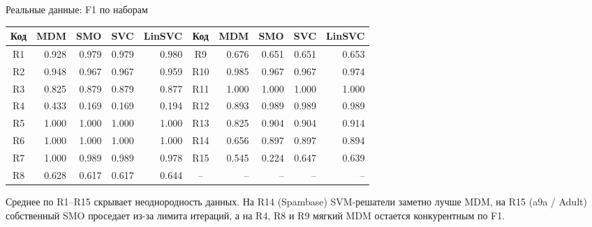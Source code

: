 \SPBGContentSlide
  {Реальные данные: F1 по наборам}
  {%
    \centering
    \TinyBody
    \renewcommand{\arraystretch}{1.08}
    \setlength{\tabcolsep}{3.2pt}
    \begin{tabular}{|c|r|r|r|r||c|r|r|r|r|}
      \hline
      \textbf{Код} & \textbf{MDM} & \textbf{SMO} & \textbf{SVC} & \textbf{LinSVC}
      & \textbf{Код} & \textbf{MDM} & \textbf{SMO} & \textbf{SVC} & \textbf{LinSVC} \\
      \hline
      R1 & 0.928 & 0.979 & 0.979 & 0.980 & R9 & 0.676 & 0.651 & 0.651 & 0.653 \\
      \hline
      R2 & 0.948 & 0.967 & 0.967 & 0.959 & R10 & 0.985 & 0.967 & 0.967 & 0.974 \\
      \hline
      R3 & 0.825 & 0.879 & 0.879 & 0.877 & R11 & 1.000 & 1.000 & 1.000 & 1.000 \\
      \hline
      R4 & 0.433 & 0.169 & 0.169 & 0.194 & R12 & 0.893 & 0.989 & 0.989 & 0.989 \\
      \hline
      R5 & 1.000 & 1.000 & 1.000 & 1.000 & R13 & 0.825 & 0.904 & 0.904 & 0.914 \\
      \hline
      R6 & 1.000 & 1.000 & 1.000 & 1.000 & R14 & 0.656 & 0.897 & 0.897 & 0.894 \\
      \hline
      R7 & 1.000 & 0.989 & 0.989 & 0.978 & R15 & 0.545 & 0.224 & 0.647 & 0.639 \\
      \hline
      R8 & 0.628 & 0.617 & 0.617 & 0.644 & -- & -- & -- & -- & -- \\
      \hline
    \end{tabular}

    \vspace{.18cm}
    \begin{minipage}{.90\linewidth}
      \SmallBody
      \raggedright
      Среднее по R1--R15 скрывает неоднородность данных. На R14 (Spambase)
      SVM-решатели заметно лучше MDM, на R15 (a9a / Adult) собственный SMO
      проседает из-за лимита итераций, а на R4, R8 и R9 мягкий MDM остается
      конкурентным по F1.
    \end{minipage}
  }

